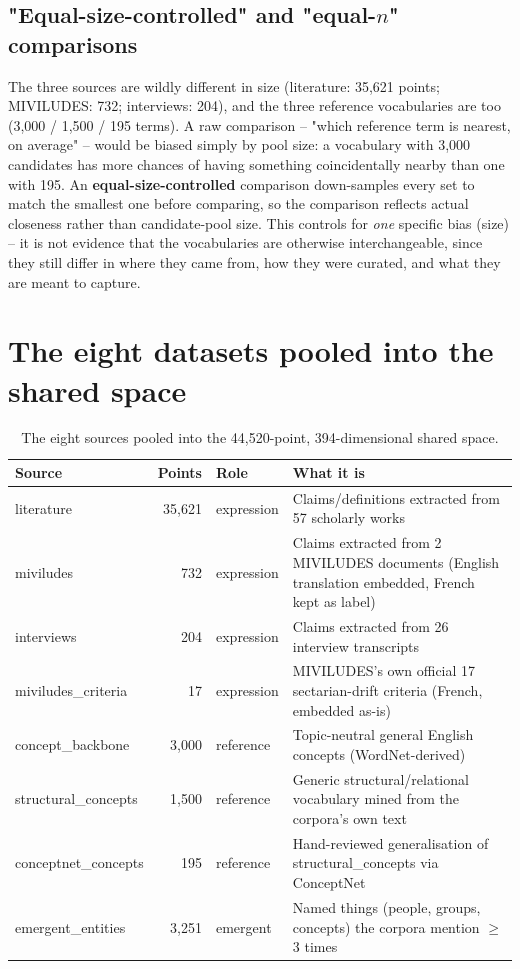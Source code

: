 \documentclass[11pt,a4paper]{article}
\newcommand{\jargon}[1]{\textbf{#1}}
\begin{document}
\subsection{"Equal-size-controlled" and "equal-$n$" comparisons}
The three sources are wildly different in size (literature: 35,621
points; MIVILUDES: 732; interviews: 204), and the three reference
vocabularies are too (3,000 / 1,500 / 195 terms). A raw comparison --
"which reference term is nearest, on average" -- would be biased simply
by pool size: a vocabulary with 3,000 candidates has more chances of
having something coincidentally nearby than one with 195. An
\jargon{equal-size-controlled} comparison down-samples every set to
match the smallest one before comparing, so the comparison reflects
actual closeness rather than candidate-pool size. This controls for
\emph{one} specific bias (size) -- it is not evidence that the
vocabularies are otherwise interchangeable, since they still differ in
where they came from, how they were curated, and what they are meant to
capture.

\section{The eight datasets pooled into the shared space}

\begin{table}[h!]
\centering
\small
\begin{tabularx}{\textwidth}{@{}l r l X@{}}
\toprule
\textbf{Source} & \textbf{Points} & \textbf{Role} & \textbf{What it is} \\
\midrule
literature & 35{,}621 & expression & Claims/definitions extracted from 57 scholarly works \\
miviludes & 732 & expression & Claims extracted from 2 MIVILUDES documents (English translation embedded, French kept as label) \\
interviews & 204 & expression & Claims extracted from 26 interview transcripts \\
miviludes\_criteria & 17 & expression & MIVILUDES's own official 17 sectarian-drift criteria (French, embedded as-is) \\
concept\_backbone & 3{,}000 & reference & Topic-neutral general English concepts (WordNet-derived) \\
structural\_concepts & 1{,}500 & reference & Generic structural/relational vocabulary mined from the corpora's own text \\
conceptnet\_concepts & 195 & reference & Hand-reviewed generalisation of structural\_concepts via ConceptNet \\
emergent\_entities & 3{,}251 & emergent & Named things (people, groups, concepts) the corpora mention $\geq$3 times \\
\bottomrule
\end{tabularx}
\caption{The eight sources pooled into the 44{,}520-point, 394-dimensional shared space.}
\end{table}
\end{document}
